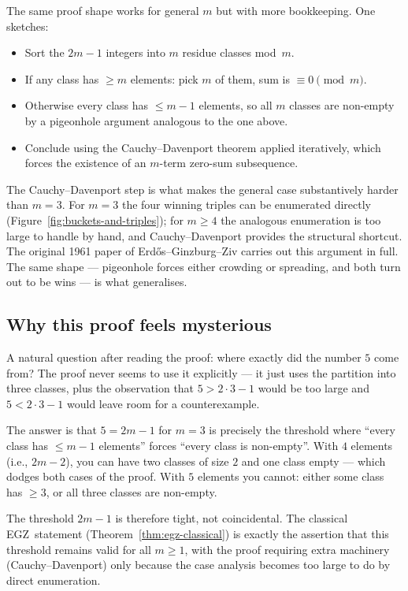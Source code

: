 \documentclass[11pt,a4paper]{article}
\theoremstyle{plain}
\theoremstyle{definition}
\theoremstyle{remark}
\newcommand{\EGZ}{\textsf{EGZ}}
\begin{document}
The same proof shape works for general $m$ but with more bookkeeping. One sketches:

\begin{itemize}[leftmargin=2em]
  \item Sort the $2m-1$ integers into $m$ residue classes mod~$m$.
  \item If any class has $\geq m$ elements: pick $m$ of them, sum is $\equiv 0 \pmod m$. \checkmark
  \item Otherwise every class has $\leq m-1$ elements, so all $m$ classes are non-empty by a pigeonhole argument analogous to the one above.
  \item Conclude using the Cauchy--Davenport theorem applied iteratively, which forces the existence of an $m$-term zero-sum subsequence.
\end{itemize}

The Cauchy--Davenport step is what makes the general case substantively harder than $m=3$. For $m=3$ the four winning triples can be enumerated directly (Figure~\ref{fig:buckets-and-triples}); for $m \geq 4$ the analogous enumeration is too large to handle by hand, and Cauchy--Davenport provides the structural shortcut. The original 1961 paper of Erd\H{o}s--Ginzburg--Ziv carries out this argument in full. The same shape --- pigeonhole forces either crowding or spreading, and both turn out to be wins --- is what generalises.

\subsection*{Why this proof feels mysterious}

A natural question after reading the proof: where exactly did the number $5$ come from? The proof never seems to use it explicitly --- it just uses the partition into three classes, plus the observation that $5 > 2 \cdot 3 - 1$ would be too large and $5 < 2 \cdot 3 - 1$ would leave room for a counterexample.

The answer is that $5 = 2m - 1$ for $m = 3$ is precisely the threshold where ``every class has $\leq m - 1$ elements'' forces ``every class is non-empty''. With $4$ elements (i.e., $2m - 2$), you can have two classes of size $2$ and one class empty --- which dodges both cases of the proof. With $5$ elements you cannot: either some class has $\geq 3$, or all three classes are non-empty.

The threshold $2m - 1$ is therefore tight, not coincidental. The classical \EGZ\ statement (Theorem~\ref{thm:egz-classical}) is exactly the assertion that this threshold remains valid for all $m \geq 1$, with the proof requiring extra machinery (Cauchy--Davenport) only because the case analysis becomes too large to do by direct enumeration.
\end{document}
